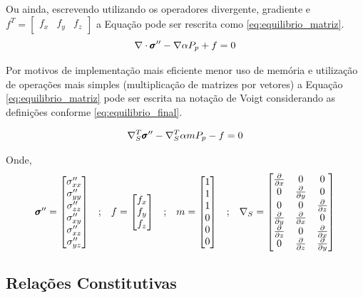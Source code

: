 Ou ainda, escrevendo utilizando os operadores divergente, gradiente e $f^T=\begin{bmatrix}f_x & f_y & f_z\end{bmatrix}$ a Equação pode ser rescrita como \eqref{eq:equilibrio_matriz}.
\begin{equation}
\label{eq:equilibrio_matriz}
\nabla \cdot \stef - \nabla \alpha P_p + f = 0
\end{equation}

Por motivos de implementação mais eficiente menor uso de memória e utilização de operações mais simples (multiplicação de matrizes por vetores) a Equação \eqref{eq:equilibrio_matriz} pode ser escrita na notação de Voigt  considerando as definições conforme \eqref{eq:equilibrio_final}.

\begin{equation}
\label{eq:equilibrio_final}
\sopnabla^T \stef - \sopnabla^T\alpha m  P_p - f = 0
\end{equation}

Onde,
\begin{equation}
\begin{matrix}\label{eq:definicoesvoigt}
\pmb{\sigma}^{\prime\prime} = \begin{bmatrix}
\sigma^{\prime\prime}_{xx}
\\
\sigma^{\prime\prime}_{yy}
\\
\sigma^{\prime\prime}_{zz}
\\
\sigma^{\prime\prime}_{xy}
\\
\sigma^{\prime\prime}_{xz}
\\
\sigma^{\prime\prime}_{yz}
\end{bmatrix}
&

;

&

f = \begin{bmatrix}
f_{x}
\\
f_{y}
\\
f_{z}
\end{bmatrix}
&
;
&

m = \begin{bmatrix} 1 \\ 1 \\ 1 \\ 0 \\ 0 \\ 0\end{bmatrix}

&
;

&
\nabla_S = \begin{bmatrix} \frac{\partial { }}{\partial x} & 0 & 0 \\ 0 & \frac{\partial { }}{\partial y} & 0 \\ 0 & 0 & \frac{\partial { }}{\partial z} \\ \frac{\partial { }}{\partial y} & \frac{\partial { }}{\partial x} & 0 \\ \frac{\partial { }}{\partial z} & 0 & \frac{\partial { }}{\partial x} \\ 0 & \frac{\partial { }}{\partial z} & \frac{\partial { }}{\partial y} \end{bmatrix}
\end{matrix}
\end{equation}



\subsection{Relações Constitutivas}

